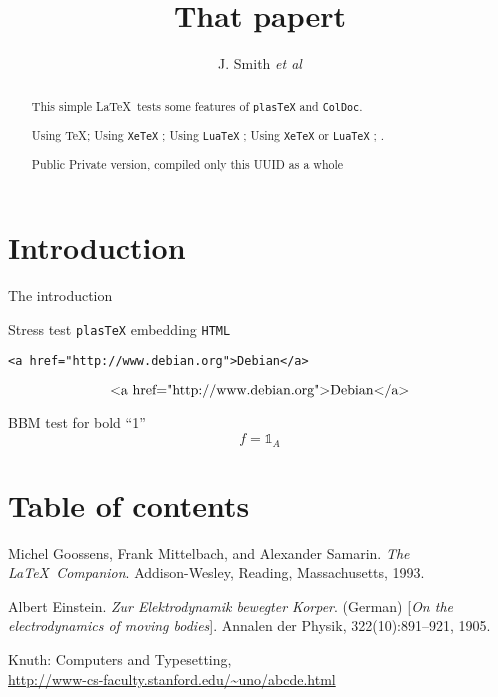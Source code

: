 \documentclass[a4paper]{article}
\newif\ifplastex\plastexfalse
\newcommand\mathbbm[1]{{\mathbb{#1}}}
\newcommand\mathbbm[1]{{\mathbb{#1}}}
\begin{document}
\author{J. Smith
\emph{et al}
}
\title{That papert}
\maketitle
\section*{Introduction}
The introduction

\begin{abstract}
  This simple \LaTeX\ tests some features
  of \texttt{plasTeX} and \texttt{ColDoc}.

  \ifetex Using  \TeX \fi ;
  \ifxetex Using \texttt{XeTeX} \fi ;
  \ifluatex Using \texttt{LuaTeX} \fi ;
  \iftutex Using \texttt{XeTeX} or \texttt{LuaTeX} \fi ;
  \ifplastex Using \texttt{plasTeX} \fi .

  \ifColDocPublic Public \else Private \fi
  version, compiled
  \ifColDocOneUUID only this UUID \else as a whole \fi
\end{abstract}

Stress test  \texttt{plasTeX} embedding \texttt{HTML}
\begin{verbatim}
<a href="http://www.debian.org">Debian</a>
\end{verbatim}
\[ \hbox{<a href="http://www.debian.org">Debian</a>} \]

BBM test for bold ``1''
\[f={\mathbbm{1}}_A\]





\section*{Table of contents}
\tableofcontents




\begin{thebibliography}{9}
Michel Goossens, Frank Mittelbach, and Alexander Samarin. 
\textit{The \LaTeX\ Companion}. 
Addison-Wesley, Reading, Massachusetts, 1993.

Albert Einstein. 
\textit{Zur Elektrodynamik bewegter Korper}. (German) 
[\textit{On the electrodynamics of moving bodies}]. 
Annalen der Physik, 322(10):891–921, 1905.

Knuth: Computers and Typesetting,
\\ \url{http://www-cs-faculty.stanford.edu/~uno/abcde.html}
\end{thebibliography}
\end{document}
